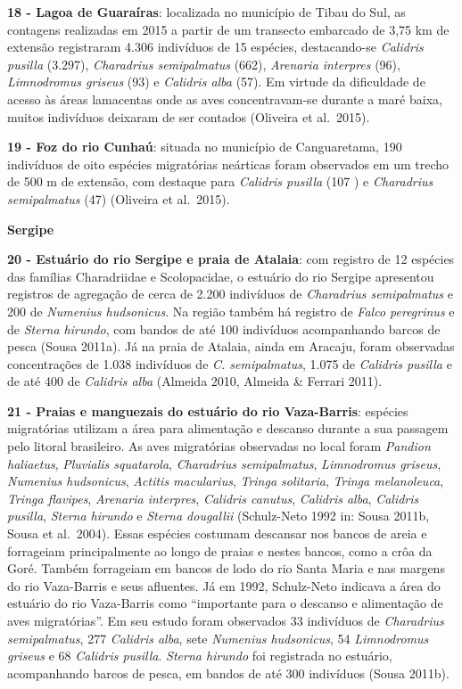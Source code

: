 \documentclass[
  oneside]{scrbook}
\begin{document}
\textbf{18 - Lagoa de Guaraíras}: localizada no município de Tibau do Sul, as contagens realizadas em 2015 a partir de um transecto embarcado de 3,75 km de extensão registraram 4.306 indivíduos de 15 espécies, destacando-se \emph{Calidris pusilla} (3.297), \emph{Charadrius semipalmatus} (662), \emph{Arenaria interpres} (96), \emph{Limnodromus griseus} (93) e \emph{Calidris alba} (57). Em virtude da dificuldade de acesso às áreas lamacentas onde as aves concentravam-se durante a maré baixa, muitos indivíduos deixaram de ser contados (Oliveira et al.~2015).

\textbf{19 - Foz do rio Cunhaú}: situada no município de Canguaretama, 190 indivíduos de oito espécies migratórias neárticas foram observados em um trecho de 500 m de extensão, com destaque para \emph{Calidris pusilla} (107 ) e \emph{Charadrius semipalmatus} (47) (Oliveira et al.~2015).

\textbf{Sergipe}

\textbf{20 - Estuário do rio Sergipe e praia de Atalaia}: com registro de 12 espécies das famílias Charadriidae e Scolopacidae, o estuário do rio Sergipe apresentou registros de agregação de cerca de 2.200 indivíduos de \emph{Charadrius semipalmatus} e 200 de \emph{Numenius hudsonicus}. Na região também há registro de \emph{Falco peregrinus} e de \emph{Sterna hirundo}, com bandos de até 100 indivíduos acompanhando barcos de pesca (Sousa 2011a). Já na praia de Atalaia, ainda em Aracaju, foram observadas concentrações de 1.038 indivíduos de \emph{C. semipalmatus}, 1.075 de \emph{Calidris pusilla} e de até 400 de \emph{Calidris alba} (Almeida 2010, Almeida \& Ferrari 2011).

\textbf{21 - Praias e manguezais do estuário do rio Vaza-Barris}: espécies migratórias utilizam a área para alimentação e descanso durante a sua passagem pelo litoral brasileiro. As aves migratórias observadas no local foram \emph{Pandion haliaetus}, \emph{Pluvialis squatarola}, \emph{Charadrius semipalmatus}, \emph{Limnodromus griseus}, \emph{Numenius hudsonicus}, \emph{Actitis macularius}, \emph{Tringa solitaria}, \emph{Tringa melanoleuca}, \emph{Tringa flavipes}, \emph{Arenaria interpres}, \emph{Calidris canutus}, \emph{Calidris alba}, \emph{Calidris pusilla}, \emph{Sterna hirundo} e \emph{Sterna dougallii} (Schulz-Neto 1992 in: Sousa 2011b, Sousa et al.~2004). Essas espécies costumam descansar nos bancos de areia e forrageiam principalmente ao longo de praias e nestes bancos, como a crôa da Goré. Também forrageiam em bancos de lodo do rio Santa Maria e nas margens do rio Vaza-Barris e seus afluentes. Já em 1992, Schulz-Neto indicava a área do estuário do rio Vaza-Barris como ``importante para o descanso e alimentação de aves migratórias''. Em seu estudo foram observados 33 indivíduos de \emph{Charadrius semipalmatus}, 277 \emph{Calidris alba}, sete \emph{Numenius hudsonicus}, 54 \emph{Limnodromus griseus} e 68 \emph{Calidris pusilla}. \emph{Sterna hirundo} foi registrada no estuário, acompanhando barcos de pesca, em bandos de até 300 indivíduos (Sousa 2011b).
\end{document}
